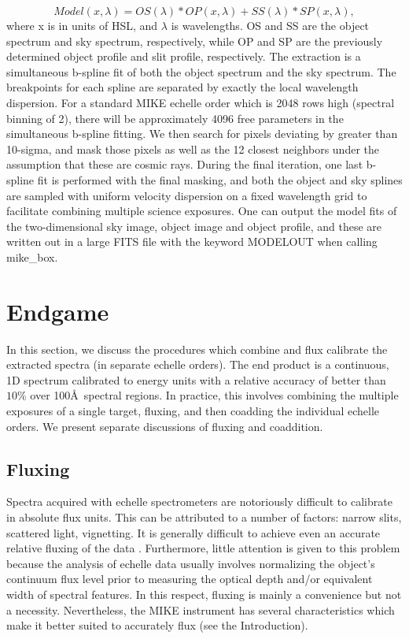 \documentclass[12pt,preprint]{aastex}
\begin{document}
\begin{equation}
Model(x,\lambda)= OS(\lambda) * OP(x,\lambda)+ SS(\lambda) * SP(x,\lambda),
\end{equation}
where x is in units of HSL, and $\lambda$ is wavelengths.  OS and SS are the
object spectrum and sky spectrum, respectively, while OP and SP are the 
previously determined object profile and slit profile, respectively.
The extraction is a simultaneous b-spline fit of both the object spectrum and
the sky spectrum.  The breakpoints for each spline are separated by exactly
the local wavelength dispersion. For a standard MIKE echelle order
which is 2048 rows high (spectral binning of 2), there will be approximately
4096 free parameters in the simultaneous b-spline fitting.  
We then search for pixels deviating by greater than 10-sigma, and mask those
pixels as well as the 12 closest neighbors
under the assumption that these are cosmic rays.
During the final iteration, one last b-spline fit is performed with the final
masking, and both the object and sky splines are sampled with uniform 
velocity dispersion on a fixed wavelength grid to facilitate 
combining multiple science exposures.  One can output
the model fits of the two-dimensional sky image,
 object image and object profile, and these are
written out in a large FITS file with the keyword MODELOUT
when calling mike\_box.

 
\section{Endgame}
\label{sec:endgame}

In this section, we discuss the procedures which combine and 
flux calibrate the extracted spectra (in separate echelle orders).
The end product is a continuous, 1D spectrum calibrated to 
energy units with a relative accuracy of better than $10\%$ over
100\AA\ spectral regions.
In practice, this involves combining the 
multiple exposures of a single target, fluxing, and then 
coadding the individual echelle orders.  We present separate
discussions of fluxing and coaddition.

\subsection{Fluxing}

Spectra acquired with echelle spectrometers are notoriously
difficult to calibrate in absolute flux units.
This can be attributed to a number of factors:  narrow slits,
scattered light, vignetting.
It is generally difficult to achieve even
an accurate relative fluxing of the data \citep[e.g.][]{dh,elp+99,suzuki}.
Furthermore, little attention is given to this problem
because the analysis of echelle data usually involves
normalizing the object's continuum flux level prior
to measuring the optical depth and/or equivalent width of spectral
features.  In this respect, fluxing is mainly a convenience but
not a necessity.  Nevertheless, the MIKE instrument has several
characteristics which make it better suited to accurately flux (see the
Introduction). 
\end{document}
